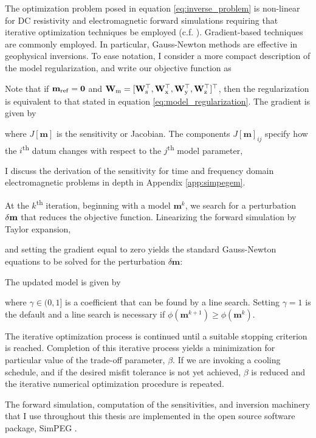The optimization problem posed in equation \ref{eq:inverse_problem} is non-linear for DC resistivity and electromagnetic forward simulations requiring that iterative optimization techniques be employed (c.f. \cite{Nocedal1999}). Gradient-based techniques are commonly employed. In particular, Gauss-Newton methods are effective in geophysical inversions. To ease notation, I consider a more compact description of the model regularization, and write our objective function as

Note that if $\mathbf{m}_{\rm ref} = \mathbf{0}$ and $\mathbf{W}_{\rm m} = [\mathbf{W}_{\rm s}^\top, \mathbf{W}_{\rm x}^\top, \mathbf{W}_{\rm y}^\top, \mathbf{W}_{\rm z}^\top]^\top$, then the regularization is equivalent to that stated in equation \ref{eq:model_regularization}. The gradient is given by

where $J[\mathbf{m}]$ is the sensitivity or Jacobian. The components $J[\mathbf{m}]_{ij}$ specify how the $i$\textsuperscript{th} datum changes with respect to the $j$\textsuperscript{th} model parameter,

I discuss the derivation of the sensitivity for time and frequency domain electromagnetic problems in depth in Appendix \ref{app:simpegem}.

At the $k$\textsuperscript{th} iteration, beginning with a model $\mathbf{m}^{k}$, we search for a perturbation $\delta \mathbf{m}$ that reduces the objective function. Linearizing the forward simulation by Taylor expansion,

and setting the gradient equal to zero yields the standard Gauss-Newton equations
to be solved for the perturbation $\delta \mathbf{m}$:

The updated model is given by

where $\gamma \in (0,1]$ is a coefficient that can be found by a line search.
Setting $\gamma=1$ is the default and a line search is necessary if $\phi(\mathbf{m}^{k+1}) \ge \phi(\mathbf{m}^{k})$.

The iterative optimization process is continued until a suitable stopping criterion is reached.
Completion of this iterative process yields a minimization for particular value of the trade-off parameter, $\beta$. If we are invoking a cooling schedule, and if the desired misfit tolerance is not yet achieved, $\beta$ is reduced and the iterative numerical optimization procedure is repeated.

The forward simulation, computation of the sensitivities, and inversion machinery that I use throughout this thesis are implemented in the open source software package, SimPEG \citep{Cockett2015, Heagy2017}.


